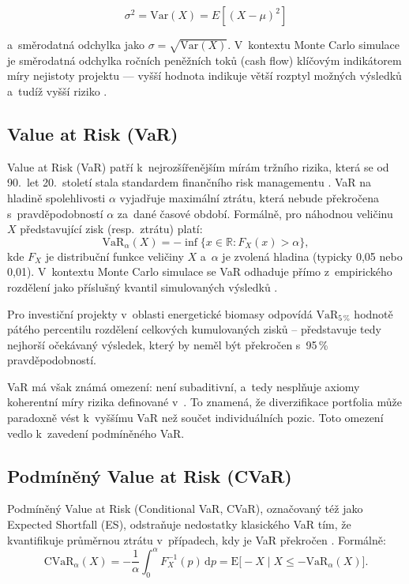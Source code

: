 \begin{equation}
\sigma^2 = \mathrm{Var}(X) = E\left[(X - \mu)^2\right]
\label{eq:rozptyl}
\end{equation}

a~směrodatná odchylka jako $\sigma = \sqrt{\mathrm{Var}(X)}$. 
V~kontextu Monte Carlo simulace je směrodatná odchylka ročních 
peněžních toků (cash flow) klíčovým indikátorem míry nejistoty 
projektu --- vyšší hodnota indikuje větší rozptyl možných výsledků 
a~tudíž vyšší riziko \cite{Vose2008}.

 
\subsection{Value at Risk (VaR)}
\label{subsec:value-at-risk}

Value at Risk (VaR) patří k~nejrozšířenějším mírám tržního rizika, která se od 90.~let 20.~století stala standardem finančního risk managementu \cite{Jorion2007}. VaR na hladině spolehlivosti $\alpha$ vyjadřuje maximální ztrátu, která nebude překročena s~pravděpodobností $\alpha$ za~dané časové období. Formálně, pro náhodnou veličinu $X$ představující zisk (resp.~ztrátu) platí:
\begin{equation}
  \text{VaR}_{\alpha}(X) = -\inf\{x \in \mathbb{R} : F_X(x) > \alpha\},
  \label{eq:var-def}
\end{equation}
kde $F_X$ je distribuční funkce veličiny $X$ a~$\alpha$ je zvolená hladina (typicky 0{,}05 nebo 0{,}01). V~kontextu Monte Carlo simulace se VaR odhaduje přímo z~empirického rozdělení jako příslušný kvantil simulovaných výsledků \cite{Glasserman2003}.

Pro investiční projekty v~oblasti energetické biomasy odpovídá $\text{VaR}_{5\,\%}$ hodnotě pátého percentilu rozdělení celkových kumulovaných zisků -- představuje tedy nejhorší očekávaný výsledek, který by neměl být překročen s~95\,\% pravděpodobností. 

VaR má však známá omezení: není subaditivní, a~tedy nesplňuje axiomy koherentní míry rizika definované v~\cite{Artzner1999}. To znamená, že diverzifikace portfolia může paradoxně vést k~vyššímu VaR než součet individuálních pozic. Toto omezení vedlo k~zavedení podmíněného VaR.

\subsection{Podmíněný Value at Risk (CVaR)}
\label{subsec:cvar}

Podmíněný Value at Risk (Conditional VaR, CVaR), označovaný též jako Expected Shortfall (ES), odstraňuje nedostatky klasického VaR tím, že kvantifikuje průměrnou ztrátu v~případech, kdy je VaR překročen \cite{Rockafellar2000}. Formálně:
\begin{equation}
  \text{CVaR}_{\alpha}(X) = -\frac{1}{\alpha} \int_0^{\alpha} F_X^{-1}(p)\,\mathrm{d}p = \text{E}\bigl[-X \mid X \leq -\text{VaR}_{\alpha}(X)\bigr].
  \label{eq:cvar-def}
\end{equation}

